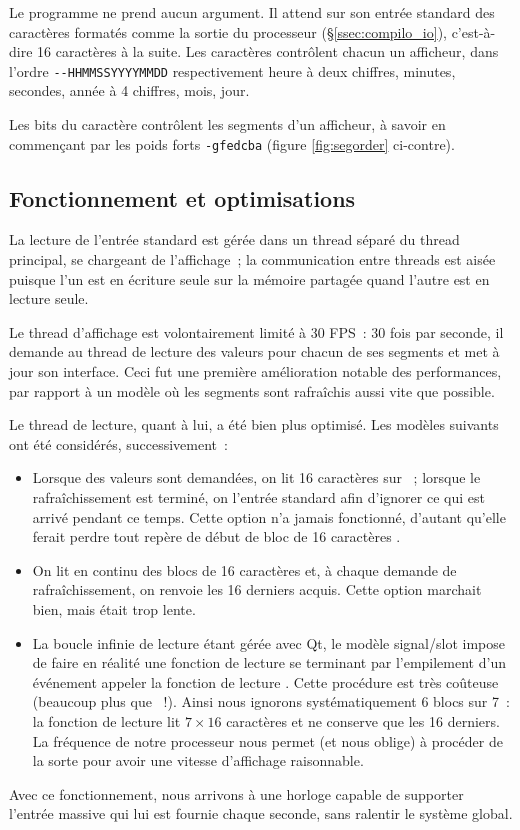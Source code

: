 \documentclass[11pt,a4paper]{article}
\begin{document}
Le programme ne prend aucun argument. Il attend sur son entrée standard des caractères formatés comme la sortie du processeur (§\ref{ssec:compilo_io}), c'est-à-dire 16 caractères à la suite. Les caractères contrôlent chacun un afficheur, dans l'ordre \verb!--HHMMSSYYYYMMDD! respectivement heure à deux chiffres, minutes, secondes, année à 4 chiffres, mois, jour.

Les bits du caractère contrôlent les segments d'un afficheur, à savoir en commençant par les poids forts \verb!-gfedcba! (figure \ref{fig:segorder} ci-contre).

\subsection{Fonctionnement et optimisations}

La lecture de l'entrée standard est gérée dans un thread séparé du thread principal, se chargeant de l'affichage~; la communication entre threads est aisée puisque l'un est en écriture seule sur la mémoire partagée quand l'autre est en lecture seule.

Le thread d'affichage est volontairement limité à 30 FPS~: 30 fois par seconde, il demande au thread de lecture des valeurs pour chacun de ses segments et met à jour son interface. Ceci fut une première amélioration notable des performances, par rapport à un modèle où les segments sont rafraîchis aussi vite que possible.

Le thread de lecture, quant à lui, a été bien plus optimisé. Les modèles suivants ont été considérés, successivement~:
\begin{itemize}
\item Lorsque des valeurs sont demandées, on lit 16 caractères sur ~; lorsque le rafraîchissement est terminé, on  l'entrée standard afin d'ignorer ce qui est arrivé pendant ce temps. Cette option n'a jamais fonctionné, d'autant qu'elle ferait perdre tout repère de \og début de bloc de 16 caractères \fg{}.

\item On lit en continu des blocs de 16 caractères et, à chaque demande de rafraîchissement, on renvoie les 16 derniers acquis. Cette option marchait bien, mais était trop lente.

\item La \og boucle infinie \fg{} de lecture étant gérée avec Qt, le modèle signal/slot impose de faire en réalité une fonction de lecture se terminant par l'empilement d'un événement \og appeler la fonction de lecture \fg{}. Cette procédure est très coûteuse (beaucoup plus que ~!). Ainsi nous ignorons systématiquement 6 blocs sur 7~: la fonction de lecture lit $7 \times 16$ caractères et ne conserve que les 16 derniers. La fréquence de notre processeur nous permet (et nous oblige) à procéder de la sorte pour avoir une vitesse d'affichage raisonnable.
\end{itemize}

Avec ce fonctionnement, nous arrivons à une horloge capable de supporter l'entrée massive qui lui est fournie chaque seconde, sans ralentir le système global.
\end{document}
